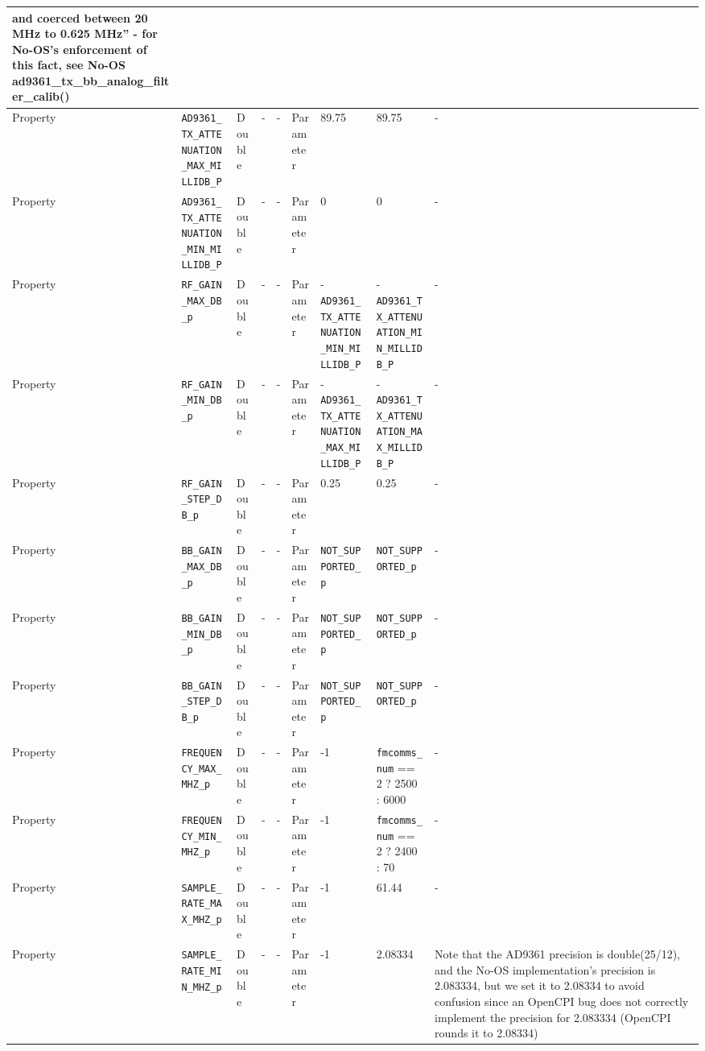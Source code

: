 \begin{landscape}
\begin{scriptsize}
\begin{longtable}{|p{1.8cm}|p{4.1cm}|p{1cm}|c|c|p{1.6cm}|p{3.7cm}|p{3.7cm}|p{2.5cm}|}
        and coerced between 20 MHz to 0.625 MHz'' - for No-OS's enforcement of
        this fact, see No-OS ad9361\_tx\_bb\_analog\_filter\_calib()  \\
			\hline
			Property     & \verb+AD9361_TX_ATTENUATION_MAX_MILLIDB_P+ & Double & -       & -          & Parameter & 89.75 & 89.75 & - \\
			\hline
			Property     & \verb+AD9361_TX_ATTENUATION_MIN_MILLIDB_P+ & Double & -       & -          & Parameter & 0 & 0 & - \\
			\hline
			Property     & \verb+RF_GAIN_MAX_DB_p+ & Double & -       & -          & Parameter & -\verb+AD9361_TX_ATTENUATION_MIN_MILLIDB_P+ & -\verb+AD9361_TX_ATTENUATION_MIN_MILLIDB_P+ & - \\
			\hline
			Property     & \verb+RF_GAIN_MIN_DB_p+ & Double & -       & -          & Parameter & -\verb+AD9361_TX_ATTENUATION_MAX_MILLIDB_P+ & -\verb+AD9361_TX_ATTENUATION_MAX_MILLIDB_P+ & - \\
			\hline
			Property     & \verb+RF_GAIN_STEP_DB_p+ & Double & -       & -          & Parameter & 0.25 & 0.25 & - \\
			\hline
			Property     & \verb+BB_GAIN_MAX_DB_p+ & Double & -       & -          & Parameter & \verb+NOT_SUPPORTED_p+ & \verb+NOT_SUPPORTED_p+ & - \\
			\hline
			Property     & \verb+BB_GAIN_MIN_DB_p+ & Double & -       & -          & Parameter & \verb+NOT_SUPPORTED_p+ & \verb+NOT_SUPPORTED_p+ & - \\
			\hline
			Property     & \verb+BB_GAIN_STEP_DB_p+ & Double & -       & -          & Parameter & \verb+NOT_SUPPORTED_p+ & \verb+NOT_SUPPORTED_p+ & - \\
			\hline
			Property     & \verb+FREQUENCY_MAX_MHZ_p+                   & Double&-        & -          & Parameter & -1 & \verb+fmcomms_num+ == 2 ? 2500 : 6000 & - \\
			\hline
			Property     & \verb+FREQUENCY_MIN_MHZ_p+                   & Double&-        & -          & Parameter & -1 & \verb+fmcomms_num+ == 2 ? 2400 : 70 & - \\
			\hline
			Property     & \verb+SAMPLE_RATE_MAX_MHZ_p+                   & Double&-        & -          & Parameter & -1 & 61.44 & - \\
			\hline
			Property     & \verb+SAMPLE_RATE_MIN_MHZ_p+                   & Double&-        & -          & Parameter & -1 & 2.08334 & Note that the AD9361 precision is double(25/12), and the No-OS implementation's precision is 2.083334, but we set it to 2.08334 to avoid confusion since an OpenCPI bug does not correctly implement the precision for 2.083334 (OpenCPI rounds it to 2.08334) \\

\end{longtable}
\end{scriptsize}
\end{landscape}
